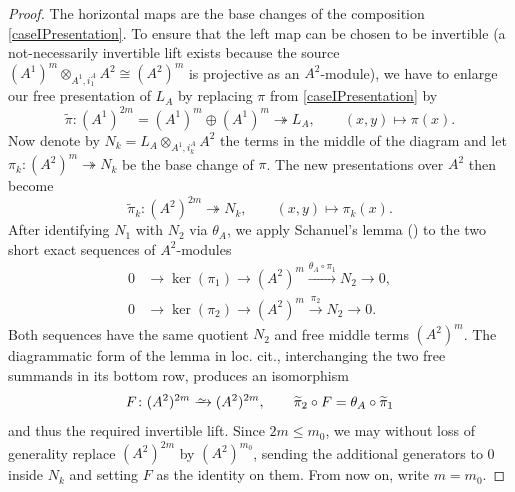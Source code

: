 \documentclass[10pt,twoside]{article}
\numberwithin{equation}{section}
\newcommand\isom{
	\xrightarrow{\smash{\raisebox{-0.65ex}{\ensuremath{\scriptstyle\sim}}}}
}
\theoremstyle{plain}
\theoremstyle{definition}
\begin{document}
\begin{proof}
The horizontal maps are the base changes of the composition \eqref{caseIPresentation}. To ensure that the left map can be chosen to be invertible (a not-necessarily invertible lift exists because the source \((A^1)^m\otimes_{A^1,i_1^A}A^2\cong(A^2)^m\) is projective as an \(A^2\)-module), we have to enlarge our free presentation of \(L_A\) by replacing \(\pi\) from \eqref{caseIPresentation} by
\[\widetilde\pi\colon (A^1)^{2m}=(A^1)^m\oplus(A^1)^m\twoheadrightarrow L_A,
\qquad (x,y)\mapsto\pi(x).\]
Now denote by \(N_k=L_A\otimes_{A^1,i_k^A}A^2\) the terms in the middle of the diagram and let \(\pi_k\colon\allowbreak (A^2)^m\twoheadrightarrow N_k\) be the base change of \(\pi\). The new presentations over \(A^2\) then become
\[\widetilde\pi_k\colon (A^2)^{2m}\twoheadrightarrow N_k,
\qquad (x,y)\mapsto\pi_k(x).\]
After identifying \(N_1\) with \(N_2\) via \(\theta_A\), we apply Schanuel's lemma (\cite[00O3]{Stacks}) to the two short exact sequences of \(A^2\)-modules
\[
\begin{aligned}
0&\longrightarrow\ker(\pi_1)\longrightarrow (A^2)^m\xrightarrow{\theta_A\circ\pi_1}N_2\longrightarrow 0,\\
0&\longrightarrow\ker(\pi_2)\longrightarrow (A^2)^m\xrightarrow{\pi_2}N_2\longrightarrow 0.
\end{aligned}
\]
Both sequences have the same quotient \(N_2\) and free middle terms \((A^2)^m\). The diagrammatic form of the lemma in loc. cit., interchanging the two free summands in its bottom row, produces an isomorphism
\[F\colon (A^2)^{2m}\isom (A^2)^{2m},
\qquad \widetilde\pi_2\circ F=\theta_A\circ\widetilde\pi_1\]
and thus the required invertible lift. Since \(2m\leq m_0\), we may without loss of generality replace \((A^2)^{2m}\) by \((A^2)^{m_0}\), sending the additional generators to 0 inside \(N_k\) and setting \(F\) as the identity on them. From now on, write \(m=m_0\).


\end{proof}
\end{document}
